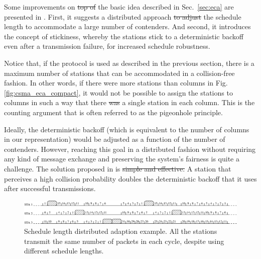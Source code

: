 \documentclass[journal]{IEEEtran}
\providecommand{\DIFadd}[1]{{\protect\color{blue}\uwave{#1}}} %
\providecommand{\DIFdel}[1]{{\protect\color{red}\sout{#1}}}                      %
\providecommand{\DIFaddbegin}{} %
\providecommand{\DIFaddend}{} %
\providecommand{\DIFdelbegin}{} %
\providecommand{\DIFdelend}{} %
\begin{document}
Some improvements on \DIFdelbegin \DIFdel{top of }\DIFdelend the basic idea described in Sec.~\ref{sec:eca} are presented in \cite{fang2011dlm}. 
First, it suggests a distributed approach \DIFdelbegin \DIFdel{to adjust }\DIFdelend \DIFaddbegin \DIFadd{for adjusting }\DIFaddend the schedule length to accommodate a large number of contenders.
And second, it introduces the concept of stickiness, whereby the stations stick to a deterministic backoff even after a transmission failure, for increased schedule robustness. 

Notice that, if the protocol is used as described in the previous section, there is a maximum number of stations that can be accommodated in a collision-free fashion.
In other words, if there were more stations than columns in Fig.\DIFaddbegin \DIFadd{~}\DIFaddend \ref{fig:csma_eca_compact}, it would not be possible to assign the stations to columns in such a way that there \DIFdelbegin \DIFdel{was }\DIFdelend \DIFaddbegin \DIFadd{is }\DIFaddend a single station in each column.
This is the counting argument that is often referred to as the pigeonhole principle.

Ideally, the deterministic backoff (which is equivalent to the number of columns in our representation) would be adjusted as a function of the number of contenders.
However, reaching this goal in a distributed fashion without requiring any kind of message exchange and preserving the system's fairness is quite a challenge.
The solution proposed in \cite{fang2011dlm} is \DIFdelbegin \DIFdel{simple and effective.
}\DIFdelend \DIFaddbegin \DIFadd{elegant and effective:
}\DIFaddend A station that perceives a high collision probability doubles the deterministic backoff that it uses after successful transmissions.

\begin{figure}[!t]
\centering
\includegraphics[width=6.0in]{figures/csma_eca_different_backoff}
\caption{Schedule length distributed adaption example. All the stations transmit the same number of packets in each cycle, despite using different schedule lengths.}
\label{fig:csma_eca_different_backoff}
\end{figure}
\end{document}
